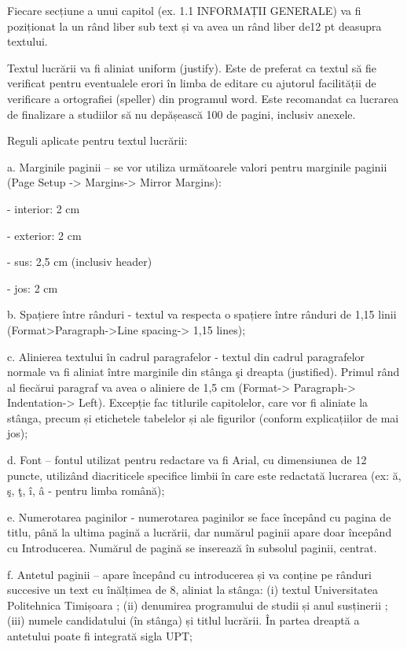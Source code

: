 \documentclass[
]{article}
\begin{document}
Fiecare secțiune a unui capitol (ex. 1.1 INFORMAȚII GENERALE) va fi
poziționat la un rând liber sub text și va avea un rând liber de12 pt
deasupra textului.

Textul lucrării va fi aliniat uniform (justify). Este de preferat ca
textul să fie verificat pentru eventualele erori în limba de editare cu
ajutorul facilității de verificare a ortografiei (speller) din programul
word. Este recomandat ca lucrarea de finalizare a studiilor să nu
depășească 100 de pagini, inclusiv anexele.

Reguli aplicate pentru textul lucrării:

a. Marginile paginii -- se vor utiliza următoarele valori pentru
marginile paginii (Page Setup -\textgreater{} Margins-\textgreater{}
Mirror Margins):

- interior: 2 cm

- exterior: 2 cm

- sus: 2,5 cm (inclusiv header)

- jos: 2 cm

b. Spațiere între rânduri - textul va respecta o spațiere între rânduri
de 1,15 linii (Format\textgreater Paragraph-\textgreater Line
spacing-\textgreater{} 1,15 lines);

c. Alinierea textului în cadrul paragrafelor - textul din cadrul
paragrafelor normale va fi aliniat între marginile din stânga şi dreapta
(justified). Primul rând al fiecărui paragraf va avea o aliniere de 1,5
cm (Format-\textgreater{} Paragraph-\textgreater{}
Indentation-\textgreater{} Left). Excepție fac titlurile capitolelor,
care vor fi aliniate la stânga, precum și etichetele tabelelor și ale
figurilor (conform explicațiilor de mai jos);

d. Font -- fontul utilizat pentru redactare va fi Arial, cu dimensiunea
de 12 puncte, utilizând diacriticele specifice limbii în care este
redactată lucrarea (ex: ă, ş, ţ, î, â - pentru limba română);

e. Numerotarea paginilor - numerotarea paginilor se face începând cu
pagina de titlu, până la ultima pagină a lucrării, dar numărul paginii
apare doar începând cu Introducerea. Numărul de pagină se inserează în
subsolul paginii, centrat.

f. Antetul paginii -- apare începând cu introducerea și va conține pe
rânduri succesive un text cu înălțimea de 8, aliniat la stânga: (i)
textul Universitatea Politehnica Timișoara ; (ii) denumirea programului
de studii și anul susținerii ; (iii) numele candidatului (în stânga) și
titlul lucrării. În partea dreaptă a antetului poate fi integrată sigla
UPT;
\end{document}

